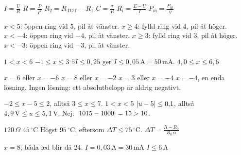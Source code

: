 \begin{facit}
  $I = \frac{U}{R}$  $R = \frac{P}{I^2}$  $R_2 = R_{\text{TOT}} - R_1$
 $C = \frac{\tau}{R}$  $R_{\text{i}} = \frac{E - U}{I}$
 $P_{\text{in}} = \frac{P_{\text{ut}}}{\eta}$

  $x < 5$: öppen ring vid $5$, pil åt vänster.
 $x \geq 4$: fylld ring vid $4$, pil åt höger.
 $x < -4$: öppen ring vid $-4$, pil åt vänster.
 $x \geq 3$: fylld ring vid $3$, pil åt höger.
 $x < -3$: öppen ring vid $-3$, pil åt vänster.

  $1 < x < 6$  $-1 \leq x \leq 3$
 $5I \leq 0{,}25$ ger $I \leq 0{,}05\,\text{A} = 50\,\text{mA}$.
 $4{,}0 \leq x \leq 6{,}6$

  $x = 6$ eller $x = -6$  $x = 8$ eller $x = -2$
 $x = 3$ eller $x = -4$  $x = -4$, en enda lösning.
 Ingen lösning: ett absolutbelopp är aldrig negativt.

  $-2 \leq x - 5 \leq 2$, alltså $3 \leq x \leq 7$.  $1 < x < 5$
 $\lvert u - 5\rvert \leq 0{,}1$, alltså $4{,}9\,\text{V} \leq u \leq 5{,}1\,\text{V}$.
 Nej: $\lvert1015 - 1000\rvert = 15 > 10$.

  $120\,\Omega$  $45\,{}^{\circ}\text{C}$
 Högst $95\,{}^{\circ}\text{C}$, eftersom $\Delta T \leq 75\,{}^{\circ}\text{C}$.
 $\Delta T = \frac{R - R_0}{R_0\,\alpha}$

  $x = 8$; båda led blir då $24$.
 $I = 0{,}03\,\text{A} = 30\,\text{mA}$  $I \leq 6\,\text{A}$

\end{facit}
